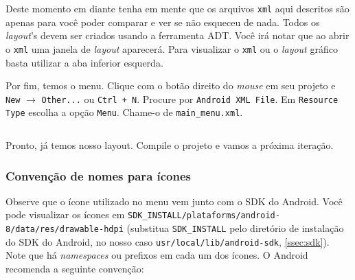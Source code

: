\begin{listing}[H]
  \inputminted[linenos=true,frame=bottomline,tabsize=3]{ xml }{ source/main-1.xml }
  \caption{Layout principal [res/layout/main.xml]}
\end{listing}

Deste momento em diante tenha em mente que os arquivos \texttt{xml} aqui
descritos são apenas para você poder comparar e ver se não esqueceu de
nada. Todos os \emph{layout}'s devem ser criados usando a ferramenta
ADT. Você irá notar que ao abrir o \texttt{xml} uma janela de
\emph{layout} aparecerá. Para visualizar o \texttt{xml} ou o
\emph{layout} gráfico basta utilizar a aba inferior esquerda.

Por fim, temos o menu. Clique com o botão direito do \emph{mouse} em seu
projeto e \texttt{New} $\rightarrow$ \texttt{Other...} ou
\texttt{Ctrl + N}. Procure por \texttt{Android XML File}. Em
\texttt{Resource Type} escolha a opção \texttt{Menu}. Chame-o de
\texttt{main\_menu.xml}.

\begin{listing}[H]
  \inputminted[linenos=true,frame=bottomline,tabsize=3]{ xml }{ source/main_menu-1.xml }
  \caption{Menu principal [res/menu/main\b{ }menu.xml]}
\end{listing}

Pronto, já temos nosso layout. Compile o projeto e vamos a próxima
iteração.

\subsubsection{Convenção de nomes para ícones \label{sssec:nomeicones}}

Observe que o ícone utilizado no menu vem junto com o SDK do Android.
Você pode visualizar os ícones em
\texttt{SDK\_INSTALL/plataforms/android-8/data/res/drawable-hdpi}
(substitua \texttt{SDK\_INSTALL} pelo diretório de instalação do SDK do
Android, no nosso caso \texttt{usr/local/lib/android-sdk},
\ref{ssec:sdk}). Note que há \emph{namespaces} ou prefixos em cada um
dos ícones. O Android recomenda a seguinte convenção:

